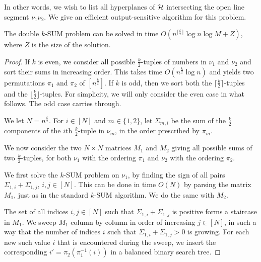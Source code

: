 In other words, we wish to list all hyperplanes of $\mathcal{H}$
intersecting the open line segment $\nu_1\nu_2$.
We give an efficient output-sensitive algorithm for this problem.

\begin{lemma}\label{lem:double}
	The double $k$-SUM problem can be solved in time $O(n^{\lceil \frac{k}{2}
	\rceil} \log n \log M + Z)$, where $Z$ is the size of the solution.
\end{lemma}
\begin{proof}
	If $k$ is even, we consider all possible $\frac{k}{2}$-tuples of numbers in
	$\nu_1$ and $\nu_2$ and sort their sums in increasing order. This takes time
	$O(n^{\frac{k}{2}} \log n)$ and yields two permutations $\pi_1$ and $\pi_2$
	of $[n^\frac{k}{2}]$.
	If $k$ is odd, then we sort both the $\lceil\frac{k}{2}\rceil$-tuples and
	the $\lfloor\frac{k}{2}\rfloor$-tuples. For simplicity, we will only
	consider the even case in what follows. The odd case carries through.

	We let $N = n^\frac{k}{2}$. For $i \in [N]$ and $m \in \{1,2\}$, let
	$\Sigma_{m,i}$ be the sum of the $\frac{k}{2}$ components of the $i$th
	$\frac{k}{2}$-tuple in $\nu_m$, in the order prescribed by $\pi_m$.

	We now consider the two $N \times N$ matrices $M_1$ and $M_2$ giving all
	possible sums of two $\frac{k}{2}$-tuples, for both $\nu_1$ with the ordering
	$\pi_1$ and $\nu_2$ with the ordering $\pi_2$.

	We first solve the $k$-SUM problem on $\nu_1$, by finding the sign of all
	pairs $\Sigma_{1,i} + \Sigma_{1,j}$, $i, j \in [N]$. This can be done in
	time $O(N)$ by parsing the matrix $M_1$, just as in the standard \(k\)-SUM algorithm.
        We do the same with $M_2$.

	The set of all indices $i, j \in [N]$ such that $\Sigma_{1,i} +
	\Sigma_{1,j}$ is positive forms a staircase in $M_1$. We sweep $M_1$ column
	by column in order of increasing $j \in [N]$, in such a way that the number
	of indices $i$ such that $\Sigma_{1,i} + \Sigma_{1,j} > 0$ is growing.
	For each new such value $i$ that is encountered during the sweep, we insert
	the corresponding $i' = \pi_2(\pi_1^{-1}(i))$ in a balanced binary search
	tree.


\end{proof}
